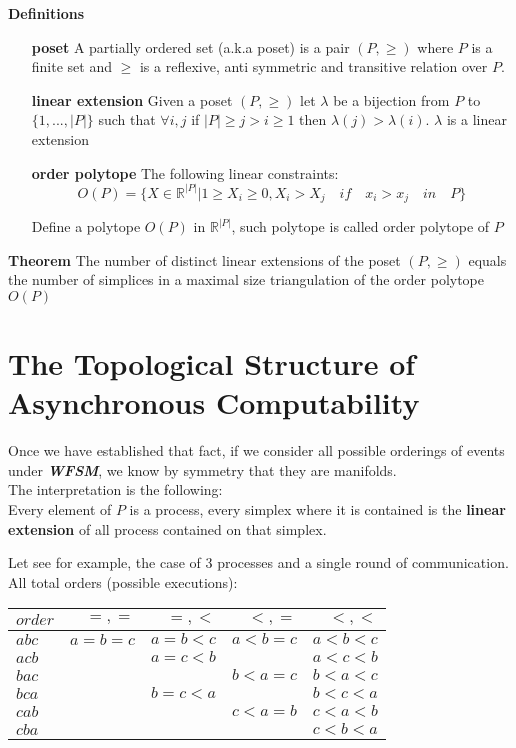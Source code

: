 \documentclass[oneside,openany]{tufte-book} %
\newcommand{\sh}{\textbf{\textit{WFSM}}\xspace}
\begin{document}
{\bf Definitions}
\begin{itemize}
\item[{\bf poset}] A partially ordered set (a.k.a poset) is a pair $(P,\ge)$ where $P$ is a finite set and $\ge$ is a reflexive, anti symmetric and transitive relation over $P$.
\item[{\bf linear extension}] Given a poset $(P,\ge)$ let $\lambda$ be a bijection from $P$ to $\{1,...,|P|\}$ such that $\forall i,j$ if $|P| \ge j > i \ge 1$ then $\lambda(j) > \lambda(i)$. $\lambda$ is a linear extension
\item[{\bf order polytope}] The following linear constraints:\\
$$
O(P)=\{X\in \mathbb{R}^{|P|} | 1 \ge X_i \ge 0, X_i > X_j \quad if \quad x_i > x_j \quad in \quad P  \}
$$

Define a polytope $O(P)$ in $ \mathbb{R}^{|P|} $, such polytope is called order polytope of  $P$ \cite{Stanley1986}
\end{itemize}

{\bf Theorem} The number of distinct linear extensions of the poset $(P,\ge)$ equals the number of simplices in a maximal size triangulation of the order polytope $O(P)$ \\

\section{The Topological Structure of Asynchronous Computability}

Once we have established that fact, if we consider all possible orderings of events under \sh, we know by symmetry that they are manifolds.\\

The interpretation is the following:\\
Every element of $P$ is a process, every simplex where it is contained is the {\bf linear extension} of all process contained on that simplex.

Let see for example, the case of 3 processes and a single round of communication.\\


All total orders (possible executions):

\begin{tabular}{ l | r r r r}
  \hline                       
$ order$ & $=,=$ & $=,<$ & $<,=$ & $<,<$\\
  \hline                       
$a b c$ & $a=b=c$ & $a=b<c$ & $a<b=c$ & $a<b<c$\\
$a c b$ &         & $a=c<b$ &         & $a<c<b$\\
$b a c$ &         &         & $b<a=c$ & $b<a<c$\\
$b c a$ &         & $b=c<a$ &         & $b<c<a$\\
$c a b$ &         &         & $c<a=b$ & $c<a<b$\\
$c b a$ &         &         &         & $c<b<a$\\
  \hline  
\end{tabular}
\end{document}
